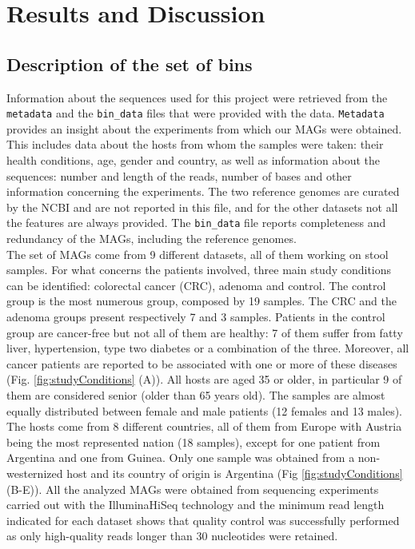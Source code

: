 \section*{Results and Discussion}

\graphicspath{{../Rscript/CMG_Rscript_files/figure-gfm/}}

\subsection*{Description of the set of bins}

Information about the sequences used for this project were retrieved from the \texttt{metadata} and the \texttt{bin\_data} files that were provided with the data. \texttt{Metadata} provides an insight about the experiments from which our MAGs were obtained. This includes data about the hosts from whom the samples were taken: their health conditions, age, gender and country, as well as information about the sequences: number and length of the reads, number of bases and other information concerning the experiments. The two reference genomes are curated by the NCBI and are not reported in this file, and for the other datasets not all the features are always provided. The \texttt{bin\_data} file reports completeness and redundancy of the MAGs, including the reference genomes.\\

The set of MAGs come from 9 different datasets, all of them working on stool samples. For what concerns the patients involved, three main study conditions can be identified: colorectal cancer (CRC), adenoma and control. The control group is the most numerous group, composed by 19 samples. The CRC and the adenoma groups present respectively 7 and 3 samples. Patients in the control group are cancer-free but not all of them are healthy: 7 of them suffer from fatty liver, hypertension, type two diabetes or a combination of the three. Moreover, all cancer patients are reported to be associated with one or more of these diseases (Fig. \ref{fig:studyConditions} (A)). All hosts are aged 35 or older, in particular 9 of them are considered senior (older than 65 years old). The samples are almost equally distributed between female and male patients (12 females and 13 males). The hosts come from 8 different countries, all of them from Europe with Austria being the most represented nation (18 samples), except for one patient from Argentina and one from Guinea. Only one sample was obtained from a non-westernized host and its country of origin is Argentina (Fig \ref{fig:studyConditions} (B-E)). All the analyzed MAGs were obtained from sequencing experiments carried out with the IlluminaHiSeq technology and the minimum read length indicated for each dataset shows that quality control was successfully performed as only high-quality reads longer than 30 nucleotides were retained.\\

